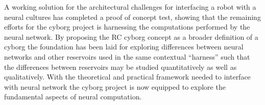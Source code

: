 A working solution for the architectural challenges for interfacing a robot with
a neural cultures has completed a proof of concept test, showing that the remaining
efforts for the cyborg project is harnessing the computations performed by the neural
network.
By proposing the RC cyborg concept as a broader definition of a cyborg the
foundation has been laid for exploring differences between neural networks and other
reservoirs used in the same contextual ``harness'' such that the differences between
reservoirs may be studied quantitatively as well as qualitatively.
With the theoretical and practical framework needed to interface with neural network
the cyborg project is now equipped to explore the fundamental aspects of neural
computation.